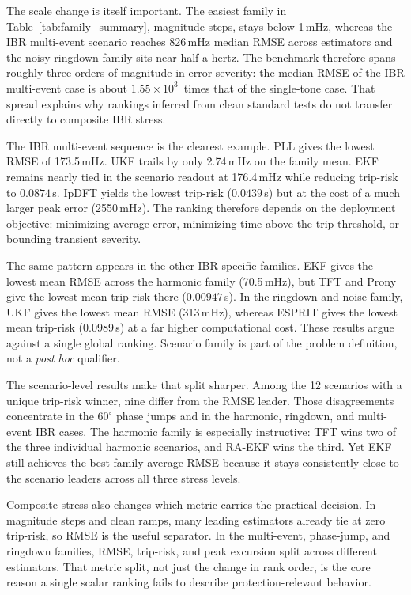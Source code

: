 The scale change is itself important. The easiest family in
Table~\ref{tab:family_summary}, magnitude steps, stays below 1\,mHz, whereas
the IBR multi-event scenario reaches 826\,mHz median RMSE across estimators and
the noisy ringdown family sits near half a hertz. The benchmark therefore spans
roughly three orders of magnitude in error severity: the median RMSE of the
IBR multi-event case is about $1.55 \times 10^3$~times that of the single-tone
case. That spread explains why rankings inferred from clean standard tests do
not transfer directly to composite IBR stress.

The IBR multi-event sequence is the clearest example. PLL gives the lowest RMSE
of 173.5\,mHz. UKF trails by only 2.74\,mHz on the family mean. EKF remains
nearly tied in the scenario readout at 176.4\,mHz while reducing trip-risk to
$0.0874$\,s. IpDFT yields the lowest trip-risk ($0.0439$\,s) but at the cost
of a much larger peak error (2550\,mHz). The
ranking therefore depends on the deployment objective: minimizing average error,
minimizing time above the trip threshold, or bounding transient severity.

The same pattern appears in the other IBR-specific families. EKF gives the
lowest mean RMSE across the harmonic family (70.5\,mHz), but TFT and Prony
give the lowest mean trip-risk there ($0.00947$\,s). In the ringdown and noise
family, UKF gives the lowest mean RMSE (313\,mHz), whereas ESPRIT gives the
lowest mean trip-risk ($0.0989$\,s) at a far higher computational cost. These
results argue against a single global ranking. Scenario family is part of
the problem definition, not a \textit{post hoc} qualifier.

The scenario-level results make that split sharper. Among the 12 scenarios with a unique
trip-risk winner, nine differ from the RMSE leader. Those
disagreements concentrate in the $60^\circ$ phase jumps and in the harmonic,
ringdown, and multi-event IBR cases. The harmonic family is especially
instructive: TFT wins two of the three individual harmonic scenarios, and
RA-EKF wins the third. Yet EKF still achieves the best family-average RMSE
because it stays consistently close to the scenario leaders across all three
stress levels.

Composite stress also changes which metric carries the practical decision. In
magnitude steps and clean ramps, many leading estimators already tie at zero
trip-risk, so RMSE is the useful separator. In the multi-event, phase-jump, and
ringdown families, RMSE, trip-risk, and peak excursion split across different
estimators. That metric split, not just the change in rank order, is the core
reason a single scalar ranking fails to describe protection-relevant
behavior.

